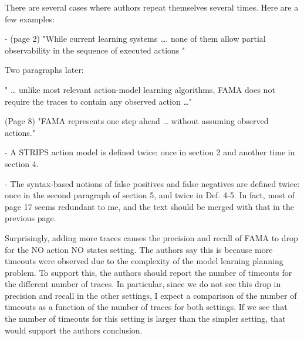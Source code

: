 \documentclass{article}
\begin{document}
\begin{mdframed}[hidealllines=true,backgroundcolor=gray!20]
  There are several cases where authors repeat themselves several times. Here are a few examples:

-          (page 2) "While current learning systems …. none of them allow partial observability in the sequence of executed actions "

Two paragraphs later:

" … unlike most relevant action-model learning algorithms, FAMA does not require the traces to contain any observed action …"

(Page 8) "FAMA represents one step ahead … without assuming observed actions."

-          A STRIPS action model is defined twice: once in section 2 and another time in section 4.

-          The syntax-based notions of false positives and false negatives are defined twice: once in the second paragraph of section 5, and twice in Def. 4-5. In fact, most of page 17 seems redundant to me, and the text should be merged with that in the previous page.
\end{mdframed}

\begin{mdframed}[hidealllines=true,backgroundcolor=gray!20]
  Surprisingly, adding more traces causes the precision and recall of FAMA to drop for the NO action NO states setting. The authors say this is because more timeouts were observed due to the complexity of the model learning planning problem. To support this, the authors should report the number of timeouts for the different number of traces. In particular, since we do not see this drop in precision and recall in the other settings, I expect a comparison of the number of timeouts as a function of the number of traces for both settings. If we see that the number of timeouts for this setting is larger than the simpler setting, that would support the authors conclusion.

\end{mdframed}
\end{document}
